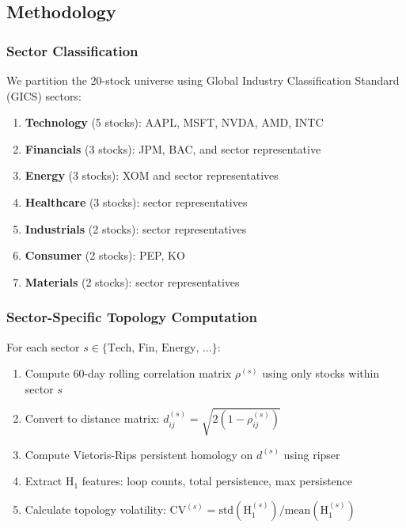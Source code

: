 \subsection{Methodology}

\subsubsection{Sector Classification}

We partition the 20-stock universe using Global Industry Classification Standard (GICS) sectors:

\begin{enumerate}
    \item \textbf{Technology} (5 stocks): AAPL, MSFT, NVDA, AMD, INTC
    \item \textbf{Financials} (3 stocks): JPM, BAC, and sector representative
    \item \textbf{Energy} (3 stocks): XOM and sector representatives
    \item \textbf{Healthcare} (3 stocks): sector representatives
    \item \textbf{Industrials} (2 stocks): sector representatives
    \item \textbf{Consumer} (2 stocks): PEP, KO
    \item \textbf{Materials} (2 stocks): sector representatives
\end{enumerate}

\subsubsection{Sector-Specific Topology Computation}

For each sector $s \in \{\text{Tech, Fin, Energy, ...}\}$:

\begin{enumerate}
    \item Compute 60-day rolling correlation matrix $\rho^{(s)}$ using only stocks within sector $s$
    \item Convert to distance matrix: $d_{ij}^{(s)} = \sqrt{2(1 - \rho_{ij}^{(s)})}$
    \item Compute Vietoris-Rips persistent homology on $d^{(s)}$ using ripser
    \item Extract H$_1$ features: loop counts, total persistence, max persistence
    \item Calculate topology volatility: $\text{CV}^{(s)} = \text{std}(\text{H}_1^{(s)}) / \text{mean}(\text{H}_1^{(s)})$
\end{enumerate}

